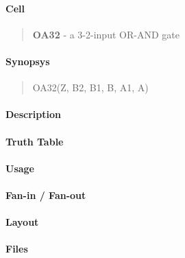 \label{OA32}
\paragraph{Cell}
\begin{quote}
    \textbf{OA32} - a 3-2-input OR-AND gate
\end{quote}

\paragraph{Synopsys}
\begin{quote}
    OA32(Z, B2, B1, B, A1, A)
\end{quote}

\paragraph{Description}

%

\paragraph{Truth Table}
%

\paragraph{Usage}

\paragraph{Fan-in / Fan-out}

\paragraph{Layout}

\paragraph{Files}
